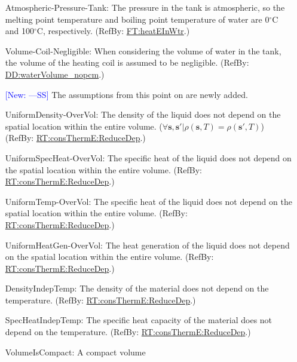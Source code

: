 \documentclass[12pt]{article}
\newcommand{\authornote}[3]{\textcolor{#1}{[#3 ---#2]}}
\newcommand{\authornote}[3]{}
\newcommand{\wss}[1]{\authornote{blue}{SS}{#1}}
\begin{document}
\begin{itemize}
\item[Atmospheric-Pressure-Tank:\phantomsection\label{assumpAPT}]{The pressure in the tank is atmospheric, so the melting point temperature and boiling point temperature of water are 0${{}^{\circ}\text{C}}$ and 100${{}^{\circ}\text{C}}$, respectively. (RefBy: \hyperref[FT:heatEInWtr]{FT:heatEInWtr}.)}
\item[Volume-Coil-Negligible:\phantomsection\label{assumpVCN}]{When considering the volume of water in the tank, the volume of the heating coil is assumed to be negligible. (RefBy: \hyperref[DD:waterVolume.nopcm]{DD:waterVolume\_nopcm}.)}

\item[\wss{New:}] The assumptions from this point on are newly added.
 
\item[UniformDensity-OverVol:\phantomsection\label{assumpUnifDens}]{The density
of the liquid does not depend on the spatial location within the entire volume.
($\forall \mathbf{s}, \mathbf{s'} | \rho(\mathbf{s}, T) = \rho(\mathbf{s'}, T)$)
(RefBy: \hyperref[RT:consThermE:ReduceDep]{RT:consThermE:ReduceDep}.)}
\item[UniformSpecHeat-OverVol:\phantomsection\label{assumpUnifSpecHeat}]{The
specific heat of the liquid does not depend on the spatial location within the
entire volume. (RefBy: \hyperref[RT:consThermE:ReduceDep]{RT:consThermE:ReduceDep}.)}
\item[UniformTemp-OverVol:\phantomsection\label{assumpUnifTemp}]{The
specific heat of the liquid does not depend on the spatial location within the
entire volume. (RefBy: \hyperref[RT:consThermE:ReduceDep]{RT:consThermE:ReduceDep}.)}
\item[UniformHeatGen-OverVol:\phantomsection\label{assumpUnifHeatGen}]{The
heat generation of the liquid does not depend on the spatial location within the
entire volume. (RefBy: \hyperref[RT:consThermE:ReduceDep]{RT:consThermE:ReduceDep}.)}
\item[DensityIndepTemp:\phantomsection\label{assumpDensIndepT}]{The density
of the material does not depend on the temperature. (RefBy: \hyperref[RT:consThermE:ReduceDep]{RT:consThermE:ReduceDep}.)}
\item[SpecHeatIndepTemp:\phantomsection\label{assumpSpecHeatIndepT}]{The
specific heat capacity of the material does not depend on the temperature.
(RefBy: \hyperref[RT:consThermE:ReduceDep]{RT:consThermE:ReduceDep}.)}
\item[VolumeIsCompact:\phantomsection\label{assumpVolCompact}]{A compact volume
}
\end{itemize}
\end{document}
